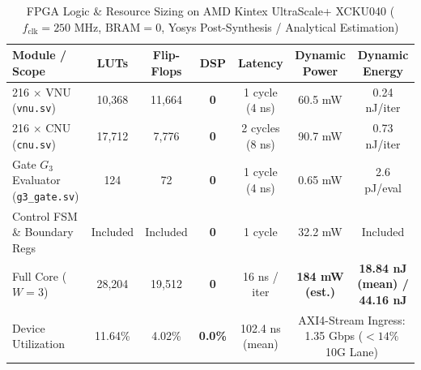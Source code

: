 \begin{table}[t]
\caption{FPGA Logic & Resource Sizing on AMD Kintex UltraScale+ XCKU040 ($f_{\text{clk}} = 250\text{ MHz}$, $\text{BRAM} = 0$, Yosys Post-Synthesis / Analytical Estimation)}
\label{tab:hardware_synth}
\centering
\begin{tabular}{lcccccc}
\toprule
\textbf{Module / Scope} & \textbf{LUTs} & \textbf{Flip-Flops} & \textbf{DSP} & \textbf{Latency} & \textbf{Dynamic Power} & \textbf{Dynamic Energy} \\
\midrule
216 $\times$ VNU (\texttt{vnu.sv}) & 10,368 & 11,664 & \textbf{0} & 1 cycle (4 ns) & 60.5 mW & 0.24 nJ/iter \\
216 $\times$ CNU (\texttt{cnu.sv}) & 17,712 & 7,776 & \textbf{0} & 2 cycles (8 ns) & 90.7 mW & 0.73 nJ/iter \\
Gate $G_3$ Evaluator (\texttt{g3\_gate.sv}) & 124 & 72 & \textbf{0} & 1 cycle (4 ns) & 0.65 mW & 2.6 pJ/eval \\
Control FSM \& Boundary Regs & Included & Included & \textbf{0} & 1 cycle & 32.2 mW & Included \\
\midrule
Full Core ($W=3$) & 28,204 & 19,512 & \textbf{0} & 16 ns / iter & \textbf{184 mW (est.)} & \textbf{18.84 nJ (mean) / 44.16 nJ} \\
Device Utilization & 11.64\% & 4.02\% & \textbf{0.0\%} & 102.4 ns (mean) & \multicolumn{2}{c}{AXI4-Stream Ingress: 1.35 Gbps ($<14\%$ 10G Lane)} \\
\bottomrule
\end{tabular}
\end{table}
